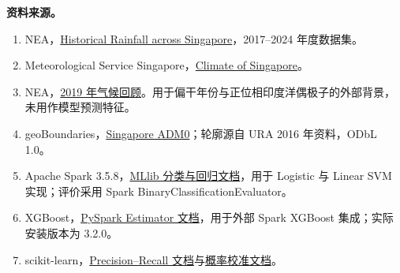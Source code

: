 \documentclass[UTF8,fontset=fandol,10pt,a4paper,landscape]{ctexart}
\begin{document}
\textbf{资料来源。}
\begin{enumerate}
\item NEA，\href{https://data.gov.sg/collections/2279/view}{Historical Rainfall across Singapore}，2017--2024 年度数据集。
\item Meteorological Service Singapore，\href{https://www.weather.gov.sg/climate-climate-of-singapore}{Climate of Singapore}。
\item NEA，\href{https://www.nea.gov.sg/media/news/news/index/2019-is-singapore-s-joint-warmest-year-on-record}{2019 年气候回顾}。用于偏干年份与正位相印度洋偶极子的外部背景，未用作模型预测特征。
\item geoBoundaries，\href{https://www.geoboundaries.org/api/current/gbOpen/SGP/ADM0/}{Singapore ADM0}；轮廓源自 URA 2016 年资料，ODbL 1.0。
\item Apache Spark 3.5.8，\href{https://spark.apache.org/docs/3.5.8/ml-classification-regression.html}{MLlib 分类与回归文档}，用于 Logistic 与 Linear SVM 实现；评价采用 Spark BinaryClassificationEvaluator。
\item XGBoost，\href{https://xgboost.readthedocs.io/en/release_3.2.0/tutorials/spark_estimator.html}{PySpark Estimator 文档}，用于外部 Spark XGBoost 集成；实际安装版本为 3.2.0。
\item scikit-learn，\href{https://scikit-learn.org/stable/modules/generated/sklearn.metrics.PrecisionRecallDisplay.html}{Precision--Recall 文档}与\href{https://scikit-learn.org/stable/modules/calibration.html}{概率校准文档}。
\end{enumerate}
\end{document}
